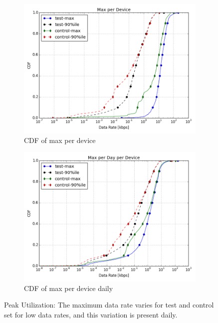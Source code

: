 \begin{figure}[ht!]
\begin{minipage}{0.90\linewidth}
\centering
%
\begin{subfigure}[b]{0.90\linewidth}
\includegraphics[width=\linewidth]{figures/cdf-max-per-device.png}
  \caption{CDF of max per device}
  \label{fig:CDF-data-rate-max}
\end{subfigure}
%
\vspace{-1em}
%
\begin{subfigure}[b]{0.90\linewidth}
\includegraphics[width=\linewidth]{figures/cdf-max-per-day-per-device.png}
  \caption{CDF of max per device daily}
  \vspace{1em}
  \label{fig:CDF-data-rate-max-daily}
\end{subfigure}
\end{minipage}
\caption{Peak Utilization: The maximum data rate varies for test and control set for low data rates, and this variation is present daily.}
\label{fig:peak-utilization}
\end{figure}
